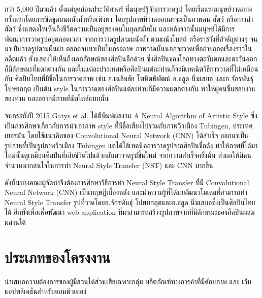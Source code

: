 \documentclass[12pt,oneside,openright,a4paper]{cpe-thai-project}
\begin{document}
\par\setlength{\parindent}{5ex}กว่า 5,000 ปีมาแล้ว ตั้งแต่ยุคก่อนประวัติศาตร์ ที่มนุษย์รู้จักการวาดรูป โดยเริ่มแรกมนุษย์วาดภาพครั้งแรกโดยการขีดขูดบนผนังถ้ำหรือเพิงพา โดยรูปภาพที่วาดออกมาจะเป็นภาพคน สัตว์ หรือการล่าสัตว์ ซึ่งแสดงให้เห็นถึงชีวิตความเป็นอยู่ของคนในยุคสมัยนั้น และหลังจากนั้นมนุษย์ได้มีการพัฒนาการวาดรูปอยู่ตลอดเวลา จากการวาดรูปตามผนังถ้ำ ตามผนังโบสถ์ หรือราชวังที่สำคัญต่างๆ จนมาเป็นวาดรูปตามผืนผ้า ตลอดจนมาเป็นในกระดาษ ภาพวาดนั้นนอกจะวาดเพื่อถ่ายถอดเรื่องราวในอดีตแล้ว ยังแสดงให้เห็นถึงเอกลักษณ์ของศิลปินอีกด้วย ซึ่งศิลปินของโลกทางตะวันตกและตะวันออกก็มีลักษณะที่แตกต่างกัน และในแต่ละประเทศหรือศิลปินแต่ละท่านก็จะมีเทคนิตวิธีการวาดที่ไม่เหมือนกัน ศิลปินไทยที่มีชื่อในการวาดภาพ เช่น อ.เฉลิมชัย โฆษิตพิพัฒน์ อ.ชลูด นิ่มเสมอ และอ.จักรพันธุ์ โปษยกฤต เป็นต้น style ในการวาดของศิลปินแต่ละท่านก็มีความแตกต่างกัน ทำให้ผู้คนชื่นชอบงานของท่าน และอยากมีภาพที่มีสไตล์แบบนั้น 
\par\setlength{\parindent}{5ex}จนกระทั่งปี 2015 Gatys et al. ได้ตีพิมพ์ผลงาน A Neural Algorithm of Artistic Style ซึ่งเป็นการศึกษาเกี่ยวกับการนำเอาภาพ style ที่มีชื่อเสียงไปรวมกับภาพวิวเมือง Tubingen, ประเทศเยอรมัน โดยใช้แนวคิดของ Convolutional Neural Network (CNN)  ได้สำเร็จ ออกมาเป็นรูปภาพที่เป็นรูปภาพวิวเมือง Tubingen แต่ได้ใช้เทคนิคการวาดรูปจากศิลปินชื่อดัง ทำให้ภาพที่ได้มาใหม่นั้นดูเหมือนศิลปินที่เสียชีวิตไปแล้วกลับมาวาดรูปขึ้นใหม่ จากความสำเร็จครั้งนั้น ส่งผลให้มีคนจำนวนมากสนใจในการทำ Neural Style Transfer (NST) และ CNN มากขึ้น
\par\setlength{\parindent}{5ex}ดังนั้นทางคณะผู้จัดทำจึงต้องการศึกษาวิธีการทำ Neural Style Transfer ที่มี Convolutional Neural Network (CNN) เป็นทฤษฎีเบื้องหลัง และนำความรู้ที่ได้มาพัฒนาโมเดลที่สามารถทำ Neural Style Transfer รูปที่วาดโดยอ.จักรพันธุ์ โปษยกฤตและอ.ชลูด นิ่มเสมอซึ่งเป็นศิลปินไทยได้ อีกทั้งเพื่อเพื่อพัฒนา web application ที่มาสามารถสร้างรูปภาพจากที่มีลักษณะของศิลปินผสมผสานได้

\section{ประเภทของโครงงาน}
\par\setlength{\parindent}{5ex}นําเสนอความต้องการของผู้มีส่วนได้ส่วนเสียเฉพาะกลุ่ม ผลิตภัณฑ์ทางการค้าที่มีศักยภาพ และ เว็บแอปพลิเคชันสำหรับคอมพิวเตอร์
\end{document}
